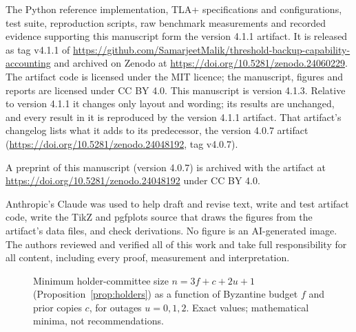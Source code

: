 \documentclass[pdflatex,sn-mathphys-num,twocolumn]{sn-jnl}
\theoremstyle{plain}
\theoremstyle{definition}
\begin{document}
The Python reference implementation, TLA+ specifications and configurations, test suite, reproduction scripts, raw benchmark measurements and recorded evidence supporting this manuscript form the version 4.1.1 artifact. It is released as tag v4.1.1 of \url{https://github.com/SamarjeetMalik/threshold-backup-capability-accounting} and archived on Zenodo at \url{https://doi.org/10.5281/zenodo.24060229}. The artifact code is licensed under the MIT licence; the manuscript, figures and reports are licensed under CC BY 4.0. This manuscript is version 4.1.3. Relative to version 4.1.1 it changes only layout and wording; its results are unchanged, and every result in it is reproduced by the version 4.1.1 artifact. That artifact's changelog lists what it adds to its predecessor, the version 4.0.7 artifact (\url{https://doi.org/10.5281/zenodo.24048192}, tag v4.0.7).

A preprint of this manuscript (version 4.0.7) is archived with the artifact at \url{https://doi.org/10.5281/zenodo.24048192} under CC BY 4.0.

Anthropic's Claude was used to help draft and revise text, write and test artifact code, write the TikZ and pgfplots source that draws the figures from the artifact's data files, and check derivations. No figure is an AI-generated image. The authors reviewed and verified all of this work and take full responsibility for all content, including every proof, measurement and interpretation.

\begin{figure}[t]
\renewcommand\thefigure{C\arabic{figure}}\renewcommand\theHfigure{C.\arabic{figure}}\setcounter{figure}{0}%
\centering

\caption{Minimum holder-committee size $n=3f+c+2u+1$ (Proposition~\ref{prop:holders}) as a function of Byzantine budget $f$ and prior copies $c$, for outages $u=0,1,2$. Exact values; mathematical minima, not recommendations.}\label{fig:minholders}
\end{figure}
\end{document}
